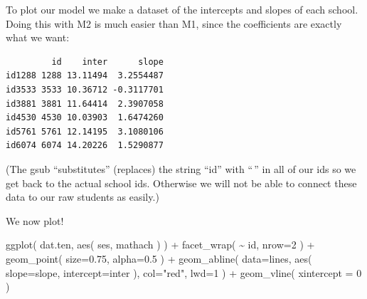 \documentclass[
  letterpaper,
  DIV=11,
  numbers=noendperiod]{scrreprt}
\newenvironment{Shaded}{}{}
\newcommand{\AttributeTok}[1]{\textcolor[rgb]{0.49,0.56,0.16}{#1}}
\newcommand{\CommentTok}[1]{\textcolor[rgb]{0.38,0.63,0.69}{\textit{#1}}}
\newcommand{\DecValTok}[1]{\textcolor[rgb]{0.25,0.63,0.44}{#1}}
\newcommand{\FloatTok}[1]{\textcolor[rgb]{0.25,0.63,0.44}{#1}}
\newcommand{\FunctionTok}[1]{\textcolor[rgb]{0.02,0.16,0.49}{#1}}
\newcommand{\NormalTok}[1]{#1}
\newcommand{\OtherTok}[1]{\textcolor[rgb]{0.00,0.44,0.13}{#1}}
\newcommand{\SpecialCharTok}[1]{\textcolor[rgb]{0.25,0.44,0.63}{#1}}
\newcommand{\StringTok}[1]{\textcolor[rgb]{0.25,0.44,0.63}{#1}}
\begin{document}
To plot our model we make a dataset of the intercepts and slopes of each
school. Doing this with M2 is much easier than M1, since the
coefficients are exactly what we want:

\begin{Shaded}
\end{Shaded}

\begin{verbatim}
         id    inter      slope
id1288 1288 13.11494  3.2554487
id3533 3533 10.36712 -0.3117701
id3881 3881 11.64414  2.3907058
id4530 4530 10.03903  1.6474260
id5761 5761 12.14195  3.1080106
id6074 6074 14.20226  1.5290877
\end{verbatim}

(The gsub ``substitutes'' (replaces) the string ``id'' with ``\,'' in
all of our ids so we get back to the actual school ids. Otherwise we
will not be able to connect these data to our raw students as easily.)

We now plot!

\begin{Shaded}
\begin{Highlighting}[]
\FunctionTok{ggplot}\NormalTok{( dat.ten, }\FunctionTok{aes}\NormalTok{( ses, mathach ) ) }\SpecialCharTok{+}
    \FunctionTok{facet\_wrap}\NormalTok{( }\SpecialCharTok{\textasciitilde{}}\NormalTok{ id, }\AttributeTok{nrow=}\DecValTok{2}\NormalTok{ ) }\SpecialCharTok{+}
    \FunctionTok{geom\_point}\NormalTok{( }\AttributeTok{size=}\FloatTok{0.75}\NormalTok{, }\AttributeTok{alpha=}\FloatTok{0.5}\NormalTok{ ) }\SpecialCharTok{+}
    \FunctionTok{geom\_abline}\NormalTok{( }\AttributeTok{data=}\NormalTok{lines, }\FunctionTok{aes}\NormalTok{( }\AttributeTok{slope=}\NormalTok{slope, }
                                  \AttributeTok{intercept=}\NormalTok{inter ), }
                 \AttributeTok{col=}\StringTok{"red"}\NormalTok{, }\AttributeTok{lwd=}\DecValTok{1}\NormalTok{ ) }\SpecialCharTok{+}
    \FunctionTok{geom\_vline}\NormalTok{( }\AttributeTok{xintercept =} \DecValTok{0}\NormalTok{ )}
\end{Highlighting}
\end{Shaded}
\end{document}
